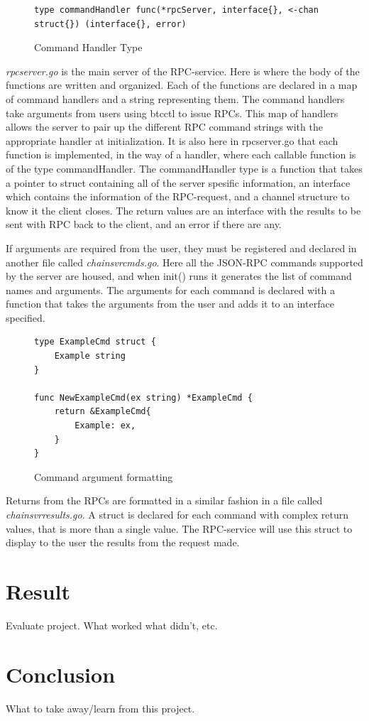 \documentclass[11pt]{article}
\begin{document}
\begin{figure}[h!]
\begin{lstlisting}[basicstyle=\small, breaklines]
type commandHandler func(*rpcServer, interface{}, <-chan struct{}) (interface{}, error)
\end{lstlisting}
\caption{Command Handler Type}
\label{fig:cmdHandler}
\end{figure}

{\it{rpcserver.go}} is the main server of the RPC-service. Here is where the body of the functions are written and organized. Each of the functions are declared in a map of command handlers and a string representing them. The command handlers take arguments from users using btcctl to issue RPCs. This map of handlers allows the server to pair up the different RPC command strings with the appropriate handler at initialization. It is also here in rpcserver.go that each function is implemented, in the way of a handler, where each callable function is of the type commandHandler. The commandHandler type is a function that takes a pointer to struct containing all of the server spesific information, an interface which contains the information of the RPC-request, and a channel structure to know it the client closes. The return values are an interface with the results to be sent with RPC back to the client, and an error if there are any.

If arguments are required from the user, they must be registered and declared in another file called {\it{chainsvrcmds.go}}. Here all the JSON-RPC commands supported by the server are housed, and when init() runs it generates the list of command names and arguments. The arguments for each command is declared with a function that takes the arguments from the user and adds it to an interface specified. 

\begin{figure}[h!]
\begin{lstlisting}[basicstyle=\small, breaklines]
type ExampleCmd struct {
	Example string
}

func NewExampleCmd(ex string) *ExampleCmd {
	return &ExampleCmd{
		Example: ex,
	}
}
\end{lstlisting}
\caption{Command argument formatting}
\label{fig:cmdArg}
\end{figure}

Returns from the RPCs are formatted in a similar fashion in a file called {\it{chainsvrresults.go}}. A struct is declared for each command with complex return values, that is more than a single value. The RPC-service will use this struct to display to the user the results from the request made. 


\section{Result}
Evaluate project. What worked what didn't, etc.

\section{Conclusion}
What to take away/learn from this project.

\newpage
 

\listoffigures
\end{document}
